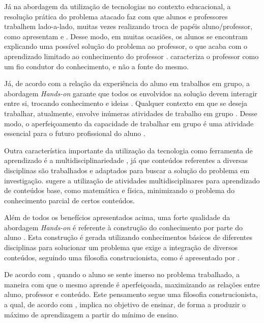 Já na abordagem da utilização de tecnologias no contexto educacional, a resolução prática do problema atacado faz com que alunos e professores trabalhem lado-a-lado, muitas vezes realizando troca de papéis aluno/professor, como apresentam \cite{construcionismoPapert} e \cite{daMaquinaDeEnsinarAMaquinaDeAprender}. Desse modo, em muitas ocasiões, os alunos se encontram explicando uma possível solução do problema ao professor, o que acaba com o aprendizado limitado ao conhecimento do professor \cite{PCsEConstrucionismo}. \cite{construcionismoPapert} caracteriza o professor como um fio condutor do conhecimento, e não a fonte do mesmo.

Já, de acordo com a relação da experiência do aluno em trabalhos em grupo, a abordagem \textit{Hands-on} garante que todos os envolvidos na solução devem interagir entre si, trocando conhecimento e ideias \cite{teachingWithRoboticKit}. Qualquer contexto em que se deseja trabalhar, atualmente, envolve inúmeras atividades de trabalho em grupo \cite{teachingWithRoboticKit}. Desse modo, o aperfeiçoamento da capacidade de trabalhar em grupo é uma atividade essencial para o futuro profissional do aluno \cite{PCsEConstrucionismo}.

Outra característica importante da utilização da tecnologia como ferramenta de aprendizado é a multidisciplinariedade \cite{analiseFerramentaEnsinoComputacao}, já que conteúdos referentes a diversas disciplinas são trabalhados e adaptados para buscar a solução do problema em investigação. \cite{teachingWithRoboticKit} sugere a utilização de atividades multidisciplinares para aprendizado de conteúdos base, como matemática e física, minimizando o problema do conhecimento parcial de certos conteúdos.

Além de todos os benefícios apresentados acima, uma forte qualidade da abordagem \textit{Hands-on} é referente à construção do conhecimento por parte do aluno \cite{PCsEConstrucionismo}. Esta construção é gerada utilizando conhecimentos básicos de diferentes disciplinas para solucionar um problema que exige a integração de diversos conteúdos, seguindo uma filosofia construcionista, como é apresentado por \cite{construcionismoPapert}.
 

	De acordo com \cite{construcionismoPapert}, quando o aluno se sente imerso no problema trabalhado, a maneira com que o mesmo aprende é aperfeiçoada, maximizando as relações entre aluno, professor e conteúdo. Este pensamento segue uma filosofia construcionista, a qual, de acordo com \cite{construcionismoPapert}, implica no objetivo de ensinar, de forma a produzir o máximo de aprendizagem a partir do mínimo de ensino.

